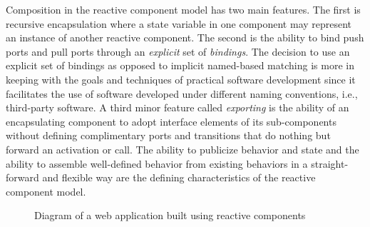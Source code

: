 Composition in the reactive component model has two main features.
The first is recursive encapsulation where a state variable in one component may represent an instance of another reactive component.
The second is the ability to bind push ports and pull ports through an \emph{explicit} set of \emph{bindings}.
The decision to use an explicit set of bindings as opposed to implicit named-based matching is more in keeping with the goals and techniques of practical software development since it facilitates the use of software developed under different naming conventions, i.e., third-party software.
A third minor feature called \emph{exporting} is the ability of an encapsulating component to adopt interface elements of its sub-components without defining complimentary ports and transitions that do nothing but forward an activation or call.
The ability to publicize behavior and state and the ability to assemble well-defined behavior from existing behaviors in a straight-forward and flexible way are the defining characteristics of the reactive component model.

\begin{figure}
\centering
{}%
\caption{Diagram of a web application built using reactive components\label{web_server}}
\end{figure}

